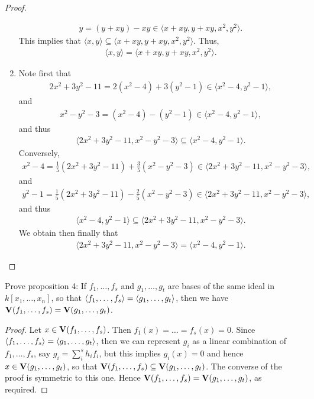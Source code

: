 \begin{proof}
\begin{enumerate}
\begin{align*}
            y = (y+xy) - xy \in \langle x+xy, y+xy, x^2, y^2\rangle.
        \end{align*}
        This implies that $\langle x,y\rangle \subseteq \langle x+xy, y+xy, x^2, y^2\rangle$. Thus,
        \begin{align*}
            \langle x,y\rangle = \langle x+xy, y+xy, x^2, y^2\rangle.
        \end{align*}
        \item Note first that
        \begin{align*}
            2x^2 + 3y^2 - 11 = 2(x^2 - 4) + 3(y^2 - 1)\in \langle x^2 - 4, y^2 - 1\rangle,
        \end{align*}
        and
        \begin{align*}
            x^2 - y^2 - 3 = (x^2 - 4) - (y^2 - 1)\in \langle x^2 - 4, y^2 - 1\rangle,
        \end{align*}
        and thus
        \begin{align*}
            \langle 2x^2 + 3y^2 - 11, x^2 - y^2 - 3\rangle \subseteq \langle x^2 - 4, y^2 -1\rangle.
        \end{align*}
        Conversely,
        \begin{align*}
            x^2 - 4 = \frac{1}{5}(2x^2 + 3y^2 - 11) + \frac{3}{5}(x^2 - y^2 - 3)\in \langle 2x^2 + 3y^2 - 11, x^2 - y^2 - 3\rangle,
        \end{align*}
        and
        \begin{align*}
            y^2 -1 = \frac{1}{5}(2x^2 + 3y^2 - 11) - \frac{2}{5}(x^2 - y^2 - 3)\in \langle 2x^2 + 3y^2 - 11, x^2 - y^2 - 3\rangle,
        \end{align*}
        and thus
        \begin{align*}
            \langle x^2 - 4, y^2 -1\rangle\subseteq \langle 2x^2 + 3y^2 - 11, x^2 - y^2 - 3\rangle.
        \end{align*}
        We obtain then finally that
        \begin{align*}
            \langle 2x^2 + 3y^2 - 11, x^2 - y^2 - 3\rangle = \langle x^2 - 4, y^2 -1\rangle.
        \end{align*}
    \end{enumerate}
\end{proof}

\begin{exercise}{4}
Prove proposition 4: 
If $f_1,\dots,f_s$ and $g_1,\dots,g_t$ are bases of the same ideal in $k[x_1,\dots,x_n]$, so that $\langle f_1,\dots,f_s\rangle = \langle g_1,\dots,g_t\rangle$, then we have $\mathbf{V}(f_1,\dots,f_s) = \mathbf{V}(g_1,\dots,g_t)$.
\end{exercise}
\begin{proof}
Let $x\in \mathbf{V}(f_1,\dots,f_s)$. 
Then $f_1(x) = \dots = f_s(x) = 0$. 
Since $\langle f_1,\dots,f_s\rangle = \langle g_1,\dots,g_t\rangle$, then we can represent $g_i$ as a linear combination of $f_1,\dots,f_s$, say $g_i = \sum_i^sh_if_i$, but this implies $g_i(x) = 0$ and hence $x\in\mathbf{V}(g_1,\dots,g_t)$, so that $\mathbf{V}(f_1,\dots,f_s)\subseteq\mathbf{V}(g_1,\dots,g_t)$. 
The converse of the proof is symmetric to this one. 
Hence $\mathbf{V}(f_1,\dots,f_s) = \mathbf{V}(g_1,\dots,g_t)$, as required.
\end{proof}

